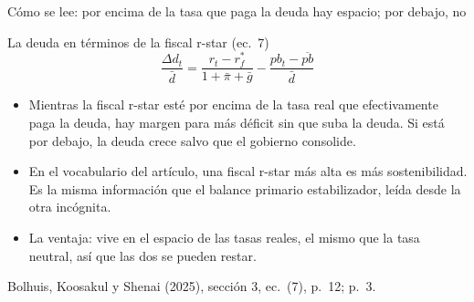 \documentclass[aspectratio=169,11pt]{beamer}
\newcommand{\fuente}[1]{\par\vfill{\small\color{cGris}#1\par}}
\newcommand{\BKS}{Bolhuis, Koosakul y Shenai (2025)}
\begin{document}
\begin{frame}{Cómo se lee: por encima de la tasa que paga la deuda hay espacio; por debajo, no}
  \begin{block}{La deuda en términos de la fiscal r-star (ec.~7)}
    \[ \frac{\Delta d_t}{\bar d} = \frac{r_t - r_f^*}{1+\bar\pi+\bar g} - \frac{pb_t - \overline{pb}}{\bar d} \]
  \end{block}
  \begin{itemize}
    \item<2-> Mientras la fiscal r-star esté por encima de la tasa real que efectivamente paga la deuda, hay margen para más déficit sin que suba la deuda. Si está por debajo, la deuda crece salvo que el gobierno consolide.
    \item<3-> En el vocabulario del artículo, una fiscal r-star más alta es más sostenibilidad. Es la misma información que el balance primario estabilizador, leída desde la otra incógnita.
    \item<4-> La ventaja: vive en el espacio de las tasas reales, el mismo que la tasa neutral, así que las dos se pueden restar.
  \end{itemize}
  \fuente{\BKS, sección 3, ec.~(7), p.~12; p.~3.}
\end{frame}
\end{document}
